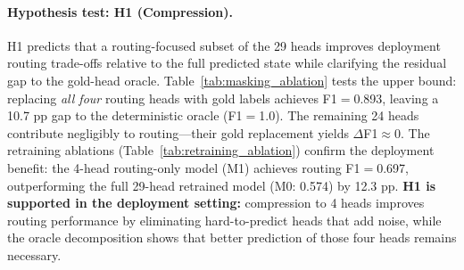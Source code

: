 \documentclass[11pt]{article}
\begin{document}
\paragraph{Hypothesis test: H1 (Compression).}
H1 predicts that a routing-focused subset of the 29 heads improves deployment routing trade-offs relative to the full predicted state while clarifying the residual gap to the gold-head oracle. Table~\ref{tab:masking_ablation} tests the upper bound: replacing \textit{all four} routing heads with gold labels achieves F1$=$0.893, leaving a 10.7 pp gap to the deterministic oracle (F1$=$1.0). The remaining 24 heads contribute negligibly to routing---their gold replacement yields $\Delta$F1${\approx}0$. The retraining ablations (Table~\ref{tab:retraining_ablation}) confirm the deployment benefit: the 4-head routing-only model (M1) achieves routing F1$=$0.697, outperforming the full 29-head retrained model (M0: 0.574) by 12.3 pp. \textbf{H1 is supported in the deployment setting:} compression to 4 heads improves routing performance by eliminating hard-to-predict heads that add noise, while the oracle decomposition shows that better prediction of those four heads remains necessary.

\begin{table}[t]
\centering
\caption{Head utility ranking by operational importance ($n{=}683$ val turns). Ranked by composite score: $\Delta$ routing F1 + 0.5 $\times$ (unsafe FP reduction). Critical heads ($\Delta$F1${>}0.05$) are essential for routing; Low heads can be dropped without degrading safety.}
\label{tab:head_utility_ranking}
\small
{}
\end{table}
\end{document}
